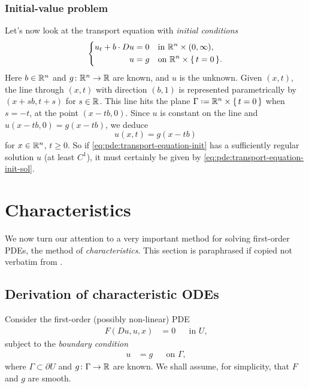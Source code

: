\subsubsection{Initial-value problem}
Let's now look at the transport equation with \emph{initial conditions}
\begin{equation}
  \label{eq:pde:transport-equation-init}
  \left\{
    \begin{aligned}
      u_t+b\cdot Du&=0&&\text{in \(\mathbb{R}^n\times(0,\infty)\),}\\
      u&=g&&\text{on \(\mathbb{R}^n\times\{\,t=0\,\}\).}
    \end{aligned}
  \right.
\end{equation}
Here \(b\in\mathbb{R}^n\) and \(g\colon\mathbb{R}^n\to\mathbb{R}\) are known, and \(u\) is
the unknown. Given \((x,t)\), the line through \((x,t)\) with direction
\((b,1)\) is represented parametrically by \((x+sb,t+s)\) for
\(s\in\mathbb{R}\). This line hits the plane
\(\Gamma\defeq\bbR^n\times\{\,t=0\,\}\) when \(s=-t\), at the point
\((x-tb,0)\). Since \(u\) is constant on the line and
\(u(x-tb,0)=g(x-tb)\), we deduce
\begin{equation}
  \label{eq:pde:transport-equation-init-sol}
  u(x,t)=g(x-tb)
\end{equation}
for \(x\in\mathbb{R}^n\), \(t\geq 0\). So if
\eqref{eq:pde:transport-equation-init} has a sufficiently regular solution
\(u\) (at least \(C^1\)), it must certainly be given by
\eqref{eq:pde:transport-equation-init-sol}.

\section{Characteristics}
We now turn our attention to a very important method for solving
first-order PDEs, the method of \emph{characteristics}. This section is
paraphrased if copied not verbatim from \cite[\S 3.2]{evans}.
\subsection{Derivation of characteristic ODEs}
Consider the first-order (possibly non-linear) PDE
\begin{equation}
  \label{eq:pde:first-order}
  \begin{aligned}
    F(Du,u,x)&=0&&\text{in \(U\),}
  \end{aligned}
\end{equation}
subject to the \emph{boundary condition}
\begin{equation}
  \label{eq:pde:boundary-condition}
  \begin{aligned}
    u&=g&&\text{on \(\Gamma\),}
  \end{aligned}
\end{equation}
where \(\Gamma\subset\partial U\) and \(g\colon\Gamma\to\mathbb{R}\) are
known. We shall assume, for simplicity, that \(F\) and \(g\) are smooth.

